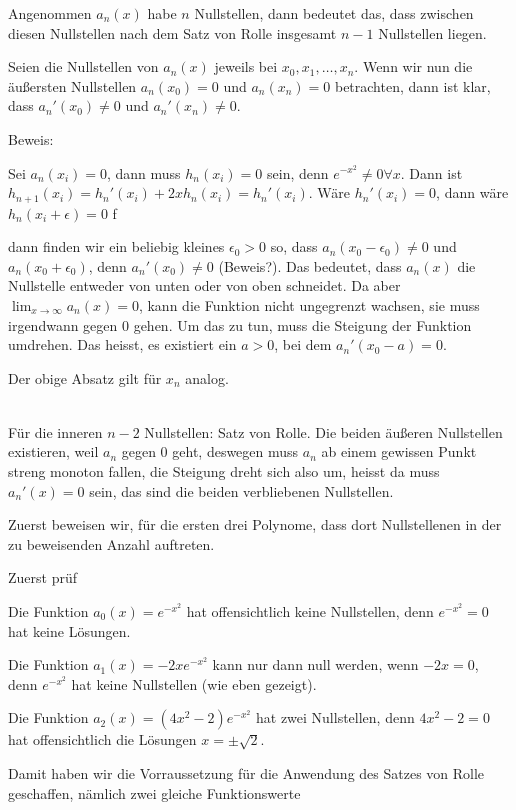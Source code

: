 \documentclass[a4paper,german,12pt,smallheadings]{scrartcl}
\begin{document}
Angenommen $a_n(x)$ habe $n$ Nullstellen, dann bedeutet das, dass zwischen
diesen Nullstellen nach dem Satz von Rolle insgesamt $n-1$ Nullstellen liegen.

Seien die Nullstellen von $a_n(x)$ jeweils bei $x_0, x_1, \dots, x_n$. Wenn wir
nun die äußersten Nullstellen $a_n(x_0) = 0$ und $a_n(x_n) = 0$ betrachten,
dann ist klar, dass $a_n'(x_0) \neq 0$ und $a_n'(x_n) \neq 0$.

Beweis:

Sei $a_n(x_i) = 0$, dann muss $h_n(x_i) = 0$ sein, denn $e^{-x^2} \neq 0
\forall x$. Dann ist $h_{n+1}(x_i) = h_n'(x_i) + 2x h_n(x_i) = h_n'(x_i)$. Wäre $h_n'(x_i) = 0$, dann wäre $h_n(x_i + \epsilon) = 0$ f


dann finden wir ein beliebig kleines $\epsilon_0 > 0$ so, dass $a_n(x_0 -
\epsilon_0) \neq 0$ und $a_n(x_0 + \epsilon_0)$, denn $a_n'(x_0) \neq 0$
(Beweis?). Das bedeutet, dass $a_n(x)$ die Nullstelle entweder von unten oder
von oben schneidet. Da aber $\lim_{x \to \infty} a_n(x) = 0$, kann die Funktion
nicht ungegrenzt wachsen, sie muss irgendwann gegen 0 gehen. Um das zu tun,
muss die Steigung der Funktion umdrehen. Das heisst, es existiert ein $a > 0$,
bei dem $a_n'(x_0 - a) = 0$.

Der obige Absatz gilt für $x_n$ analog.


\begin{align*}
  
\end{align*}

Für die inneren $n-2$ Nullstellen: Satz von Rolle. Die beiden äußeren
Nullstellen existieren, weil $a_n$ gegen 0 geht, deswegen muss $a_n$ ab einem
gewissen Punkt streng monoton fallen, die Steigung dreht sich also um, heisst
da muss $a_n'(x) = 0$ sein, das sind die beiden verbliebenen Nullstellen.

Zuerst beweisen wir, für die ersten drei Polynome, dass dort Nullstellenen in
der zu beweisenden Anzahl auftreten.

Zuerst prüf

Die Funktion $a_0(x) = e^{-x^2}$ hat offensichtlich keine Nullstellen, denn
$e^{-x^2} = 0$ hat keine Lösungen.

Die Funktion $a_1(x) = -2x e^{-x^2}$ kann nur dann null werden, wenn $-2x = 0$,
denn $e^{-x^2}$ hat keine Nullstellen (wie eben gezeigt).

Die Funktion $a_2(x) = (4x^2 - 2) e^{-x^2}$ hat zwei Nullstellen, denn $4x^2 -
2 = 0$ hat offensichtlich die Lösungen $x = \pm \sqrt{2}$.

Damit haben wir die Vorraussetzung für die Anwendung des Satzes von Rolle geschaffen, nämlich zwei gleiche Funktionswerte
\end{document}
